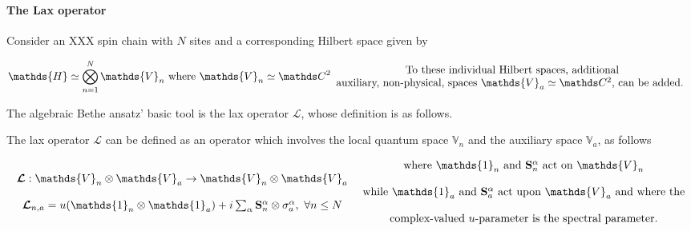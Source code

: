 \documentclass{homework}
\begin{document}
\textnormal{ } \\

\paragraph{\textbf{The Lax operator}} Consider an XXX spin chain with $N$ sites and a corresponding Hilbert space given by 

\begin{align}
    \mathds{H} \simeq \bigotimes_{n=1}^{N} {\mathds{V}_n} \textnormal{ where } {\mathds{V}_n} \simeq \ctwo \begin{array}{c}
         \textnormal{To these individual Hilbert spaces, additional}  \\
         \textnormal{auxiliary, non-physical, spaces $\mathds{V}_a \simeq \ctwo$, can be added. } \\
    \end{array}
\end{align}

The algebraic Bethe ansatz' basic tool is the lax operator $\bm{\mathcal{L}}$, whose definition is as follows. 

\begin{df}
   The lax operator $\bm{\mathcal{L}}$ can be defined as an operator which involves the local quantum space $\mathds{V}_n$ and the auxiliary space $\mathds{V}_a$, as follows 

\begin{equation}
    \begin{array}{c}
         \bm{\mathcal{L}} : \mathds{V}_n \otimes \mathds{V}_a \rightarrow \mathds{V}_n \otimes \mathds{V}_a \\
         \\
         \bm{\mathcal{L}}_{n, a} = u(\mathds{1}_n \otimes \mathds{1}_a) + i \sum_{\alpha} \spin_n^\alpha \otimes \sigma_{a}^\alpha, \blanky \forall n \leq N \\
    \end{array} \begin{array}{c}
         \textnormal{ where $\mathds{1}_n$ and $\spin_n^\alpha$ act on $\mathds{V}_n $} \\
         \\
         \textnormal{ while $\mathds{1}_a$ and $\spin_a^\alpha$ act upon $\mathds{V}_a$ and where the}\\
         \\
         \textnormal{ complex-valued $u$-parameter is the spectral parameter.}
    \end{array}
    \label{lax operator}
\end{equation}
\end{df}
\end{document}
